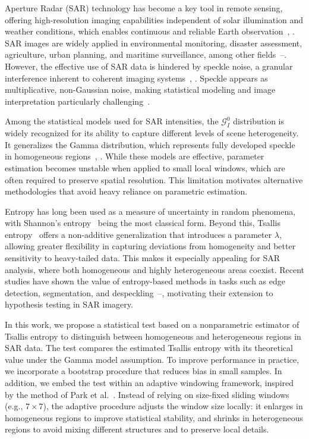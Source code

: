 \documentclass[
  lettersize  journal,
]{IEEEtran}%
\begin{document}
 Aperture Radar (SAR) technology has become a
key tool in remote sensing, offering high-resolution imaging
capabilities independent of solar illumination and weather conditions,
which enables continuous and reliable Earth
observation~,
. SAR images are widely applied in
environmental monitoring, disaster assessment, agriculture, urban
planning, and maritime surveillance, among other
fields~--.
However, the effective use of SAR data is hindered by speckle noise, a
granular interference inherent to coherent imaging
systems~,
. Speckle appears as multiplicative,
non-Gaussian noise, making statistical modeling and image interpretation
particularly challenging~.

Among the statistical models used for SAR intensities, the
\(\mathcal{G}_I^0\) distribution is widely recognized for its ability to
capture different levels of scene heterogeneity. It generalizes the
Gamma distribution, which represents fully developed speckle in
homogeneous regions~,
. While these models are effective,
parameter estimation becomes unstable when applied to small local
windows, which are often required to preserve spatial resolution. This
limitation motivates alternative methodologies that avoid heavy reliance
on parametric estimation.

Entropy has long been used as a measure of uncertainty in random
phenomena, with Shannon's entropy~
being the most classical form. Beyond this, Tsallis
entropy~ offers a non-additive
generalization that introduces a parameter \(\lambda\), allowing greater
flexibility in capturing deviations from homogeneity and better
sensitivity to heavy-tailed data. This makes it especially appealing for
SAR analysis, where both homogeneous and highly heterogeneous areas
coexist. Recent studies have shown the value of entropy-based methods in
tasks such as edge detection, segmentation, and
despeckling~--,
motivating their extension to hypothesis testing in SAR imagery.

In this work, we propose a statistical test based on a nonparametric
estimator of Tsallis entropy to distinguish between homogeneous and
heterogeneous regions in SAR data. The test compares the estimated
Tsallis entropy with its theoretical value under the Gamma model
assumption. To improve performance in practice, we incorporate a
bootstrap procedure that reduces bias in small samples. In addition, we
embed the test within an adaptive windowing framework, inspired by the
method of Park et al.~. Instead of
relying on size-fixed sliding windows (e.g., \(7 \times 7\)), the
adaptive procedure adjusts the window size locally: it enlarges in
homogeneous regions to improve statistical stability, and shrinks in
heterogeneous regions to avoid mixing different structures and to
preserve local details.
\end{document}
